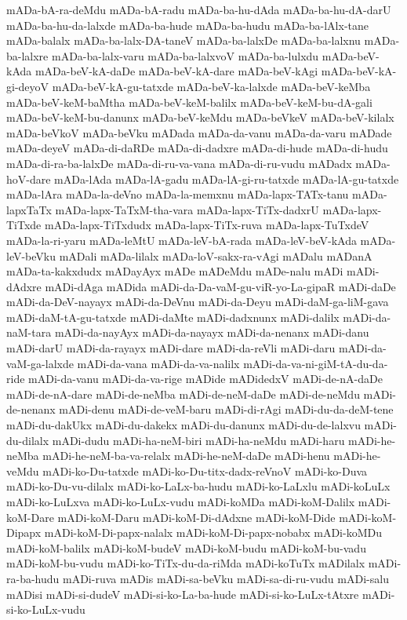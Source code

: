 {mADa-bA-ra-deMdu
mADa-bA-radu
mADa-ba-hu-dAda
mADa-ba-hu-dA-darU
mADa-ba-hu-da-lalxde
mADa-ba-hude
mADa-ba-hudu
mADa-ba-lAlx-tane
mADa-balalx
mADa-ba-lalx-DA-taneV
mADa-ba-lalxDe
mADa-ba-lalxnu
mADa-ba-lalxre
mADa-ba-lalx-varu
mADa-ba-lalxvoV
mADa-ba-lulxdu
mADa-beV-kAda
mADa-beV-kA-daDe
mADa-beV-kA-dare
mADa-beV-kAgi
mADa-beV-kA-gi-deyoV
mADa-beV-kA-gu-tatxde
mADa-beV-ka-lalxde
mADa-beV-keMba
mADa-beV-keM-baMtha
mADa-beV-keM-balilx
mADa-beV-keM-bu-dA-gali
mADa-beV-keM-bu-danunx
mADa-beV-keMdu
mADa-beVkeV
mADa-beV-kilalx
mADa-beVkoV
mADa-beVku
mADada
mADa-da-vanu
mADa-da-varu
mADade
mADa-deyeV
mADa-di-daRDe
mADa-di-dadxre
mADa-di-hude
mADa-di-hudu
mADa-di-ra-ba-lalxDe
mADa-di-ru-va-vana
mADa-di-ru-vudu
mADadx
mADa-hoV-dare
mADa-lAda
mADa-lA-gadu
mADa-lA-gi-ru-tatxde
mADa-lA-gu-tatxde
mADa-lAra
mADa-la-deVno
mADa-la-memxnu
mADa-lapx-TATx-tanu
mADa-lapxTaTx
mADa-lapx-TaTxM-tha-vara
mADa-lapx-TiTx-dadxrU
mADa-lapx-TiTxde
mADa-lapx-TiTxdudx
mADa-lapx-TiTx-ruva
mADa-lapx-TuTxdeV
mADa-la-ri-yaru
mADa-leMtU
mADa-leV-bA-rada
mADa-leV-beV-kAda
mADa-leV-beVku
mADali
mADa-lilalx
mADa-loV-sakx-ra-vAgi
mADalu
mADanA
mADa-ta-kakxdudx
mADayAyx
mADe
mADeMdu
mADe-nalu
mADi
mADi-dAdxre
mADi-dAga
mADida
mADi-da-Da-vaM-gu-viR-yo-La-gipaR
mADi-daDe
mADi-da-DeV-nayayx
mADi-da-DeVnu
mADi-da-Deyu
mADi-daM-ga-liM-gava
mADi-daM-tA-gu-tatxde
mADi-daMte
mADi-dadxnunx
mADi-dalilx
mADi-da-naM-tara
mADi-da-nayAyx
mADi-da-nayayx
mADi-da-nenanx
mADi-danu
mADi-darU
mADi-da-rayayx
mADi-dare
mADi-da-reVli
mADi-daru
mADi-da-vaM-ga-lalxde
mADi-da-vana
mADi-da-va-nalilx
mADi-da-va-ni-giM-tA-du-da-ride
mADi-da-vanu
mADi-da-va-rige
mADide
mADidedxV
mADi-de-nA-daDe
mADi-de-nA-dare
mADi-de-neMba
mADi-de-neM-daDe
mADi-de-neMdu
mADi-de-nenanx
mADi-denu
mADi-de-veM-baru
mADi-di-rAgi
mADi-du-da-deM-tene
mADi-du-dakUkx
mADi-du-dakekx
mADi-du-danunx
mADi-du-de-lalxvu
mADi-du-dilalx
mADi-dudu
mADi-ha-neM-biri
mADi-ha-neMdu
mADi-haru
mADi-he-neMba
mADi-he-neM-ba-va-relalx
mADi-he-neM-daDe
mADi-henu
mADi-he-veMdu
mADi-ko-Du-tatxde
mADi-ko-Du-titx-dadx-reVnoV
mADi-ko-Duva
mADi-ko-Du-vu-dilalx
mADi-ko-LaLx-ba-hudu
mADi-ko-LaLxlu
mADi-koLuLx
mADi-ko-LuLxva
mADi-ko-LuLx-vudu
mADi-koMDa
mADi-koM-Dalilx
mADi-koM-Dare
mADi-koM-Daru
mADi-koM-Di-dAdxne
mADi-koM-Dide
mADi-koM-Dipapx
mADi-koM-Di-papx-nalalx
mADi-koM-Di-papx-nobabx
mADi-koMDu
mADi-koM-balilx
mADi-koM-budeV
mADi-koM-budu
mADi-koM-bu-vadu
mADi-koM-bu-vudu
mADi-ko-TiTx-du-da-riMda
mADi-koTuTx
mADilalx
mADi-ra-ba-hudu
mADi-ruva
mADis
mADi-sa-beVku
mADi-sa-di-ru-vudu
mADi-salu
mADisi
mADi-si-dudeV
mADi-si-ko-La-ba-hude
mADi-si-ko-LuLx-tAtxre
mADi-si-ko-LuLx-vudu
}
